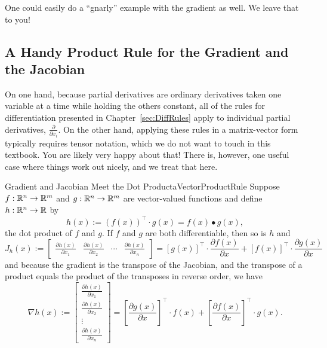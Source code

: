 \vspace*{0.2cm}

One could easily do a ``gnarly'' example with the gradient as well. We leave that to you!

\subsection{A Handy Product Rule for the Gradient and the Jacobian}

On one hand, because partial derivatives are ordinary derivatives taken one variable at a time while holding the others constant, all of the rules for differentiation presented in Chapter~\ref{sec:DiffRules} apply to individual partial derivatives, $\frac{\partial }{\partial x_i}$. On the other hand, applying these rules in a matrix-vector form typically requires tensor notation, which we do not want to touch in this textbook. You are likely very happy about that! There is, however, one useful case where things work out nicely, and we treat that here.


\begin{propColor}{Gradient and Jacobian Meet the Dot Product}{aVectorProductRule}
    Suppose $f:\mathbb R^{n} \to \mathbb R^{m}$ and $g:\mathbb R^{n} \to \mathbb R^{m}$ are vector-valued functions and define $h:\mathbb R^{n} \to \mathbb R$ by 
    \begin{equation}
        h(x):= \left(f(x)\right) ^\top \cdot g(x) = f(x) \bullet g(x), 
    \end{equation}
the dot product of $f$ and $g$. If $f$ and $g$ are both differentiable, then so is $h$ and 
   \begin{equation}
   J_h(x) := \left[ \begin{array}{cccc} \frac{\partial h(x)}{\partial x_1}  & \frac{\partial h(x)}{\partial x_2} & \cdots & \frac{\partial h(x)}{\partial x_n} \end{array} \right] = \left[g(x)\right]^\top \cdot\frac{\partial f(x)}{\partial x}  + \left[f(x)\right]^\top \cdot\frac{\partial g(x)}{\partial x} \end{equation}
and because the gradient is the transpose of the Jacobian, and the transpose of a product equals the product of the transposes in reverse order, we have 
   \begin{equation}
  \nabla h(x) :=  \left[ \begin{array}{c} \frac{\partial h(x)}{\partial x_1}  \\ \frac{\partial h(x)}{\partial x_2}  \\ \vdots  \\  \frac{\partial h(x)}{\partial x_n} \end{array} \right] = \left[ \frac{\partial g(x)}{\partial x} \right]^\top \cdot  f(x)  + 
   \left[ \frac{\partial f(x)}{\partial x} \right]^\top \cdot g(x).
\end{equation}
\end{propColor}

